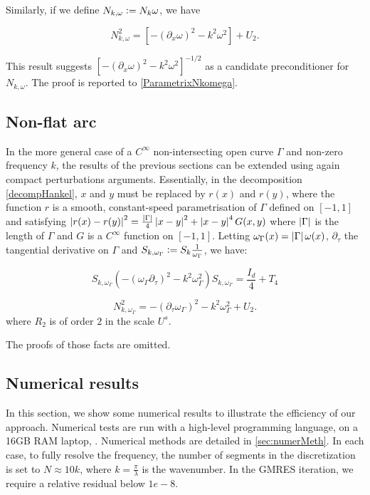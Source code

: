 \documentclass[a4paper]{article}
\begin{document}
Similarly, if we define $N_{k,\omega} \mathrel{\mathop:}= N_k \omega$, we have
\begin{The}
	\label{the:ParametrixNkomega}
	\[N_{k,\omega}^2 = \left[-(\partial_x \omega)^2 - k^2 \omega^2\right] + U_2. \]
\end{The}
This result suggests $\left[-(\partial_x \omega)^2 - k^2 \omega^2 \right]^{-1/2}$ as a candidate preconditioner for $N_{k,\omega}$.  The proof is reported to \autoref{ParametrixNkomega}. 


\subsection{Non-flat arc}

In the more general case of a $C^{\infty}$ non-intersecting open curve $\Gamma$ and non-zero frequency $k$, the results of the previous sections can be extended using again compact perturbations arguments. Essentially, in the decomposition \autoref{decompHankel}, $x$ and $y$ must be replaced by $r(x)$ and $r(y)$, where the function $r$ is a smooth, constant-speed parametrisation of $\Gamma$ defined on $[-1,1]$ and satisfying $\left\lvert r(x) - r(y) \right\rvert^2 = \frac{\left\lvert \Gamma \right\rvert}{4} \left\lvert x - y \right\rvert^2 + \left\lvert x-y \right\rvert^4 G(x,y)$ where $\left\lvert \Gamma \right\rvert$ is the length of $\Gamma$ and $G$ is a $C^{\infty}$ function on $[-1,1]$. Letting $\omega_\Gamma(x) = \left\lvert \Gamma \right\rvert \omega(x)$, $\partial_\tau$ the tangential derivative on $\Gamma$ and $S_{k,\omega_{\Gamma}} \mathrel{\mathop:}= S_k \frac{1}{\omega_\Gamma}$, we have: 
\begin{The}
	\label{TheHelmholtz3}
	\[S_{k,\omega_\Gamma} \left( -(\omega_\Gamma \partial_\tau)^2 - k^2\omega_\Gamma^2\right) S_{k,\omega_\Gamma} = \frac{I_d}{4} + T_4\]
\end{The}
\begin{The}
	\label{TheHelmholtz4}
	\[N_{k,\omega_\Gamma}^2 =  -(\partial_\tau \omega_\Gamma)^2 - k^2\omega_\Gamma^2 + U_2.\]
	where $R_2$ is of order $2$ in the scale $U^s$. 
\end{The}
\noindent The proofs of those facts are omitted. 

\subsection{Numerical results}
\label{subsec:efficiencyHelm}

In this section, we show some numerical results to illustrate the efficiency of our approach. Numerical tests are run with a high-level programming language, on a 16GB RAM laptop, . Numerical methods are detailed in \autoref{sec:numerMeth}. In each case, to fully resolve the frequency, the number of segments in the discretization is set to $N \approx 10k$, where $k = \frac{\pi}{\lambda}$ is the wavenumber. In the GMRES iteration, we require a relative residual below $1e-8$. 
\end{document}
